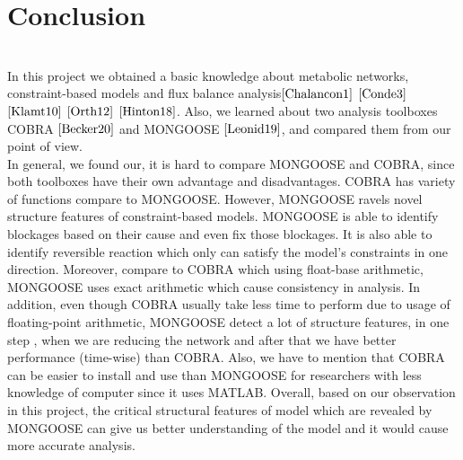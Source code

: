 \documentclass[11pt, a4paper]{article}
\begin{document}
	\section{Conclusion}
	~\\In this project we obtained a basic knowledge about metabolic networks, constraint-based models and flux balance analysis$\cite{Chalancon1}$ $\cite{Conde3}$ $\cite{Klamt10}$ $\cite{Orth12}$ $\cite{Hinton18}$. Also, we learned about two analysis toolboxes COBRA $\cite{Becker20}$ and MONGOOSE $\cite{Leonid19}$, and compared them from our point of view.\\
	In general, we found our, it is hard to compare MONGOOSE and COBRA, since both toolboxes have their own advantage and disadvantages. COBRA has variety of functions compare to MONGOOSE. However, MONGOOSE ravels novel structure features of constraint-based models. MONGOOSE is able to identify blockages based on their cause and even fix those blockages. It is also able to identify reversible reaction which only can satisfy the model's constraints in one direction. Moreover, compare to COBRA which using float-base arithmetic, MONGOOSE uses exact arithmetic which cause consistency in analysis. In addition, even though COBRA usually take less time to perform due to usage of floating-point arithmetic, MONGOOSE detect a lot of structure features, in one step , when we are reducing the network and after that we have better performance (time-wise) than COBRA. Also, we have to mention that COBRA can be easier to install and use than MONGOOSE for researchers with less knowledge of computer since it uses MATLAB. Overall, based on our observation in this project, the critical structural features of model which are revealed by MONGOOSE can give us better understanding of the model and it would cause more accurate analysis. 
	\newpage
	\renewcommand\refname{References}
	\raggedright
	
	
	\newpage
\end{document}
